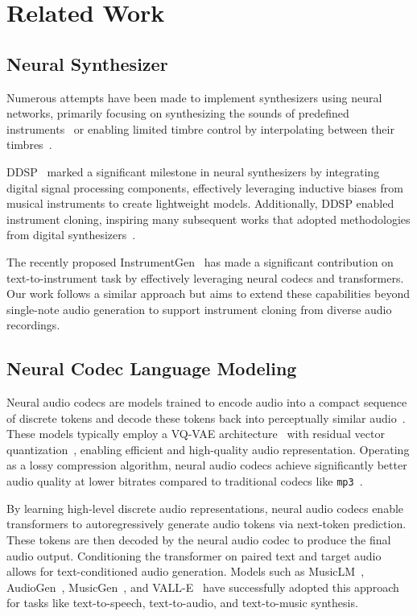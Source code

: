 \section{Related Work}
\label{sec:related_work}

\subsection{Neural Synthesizer}
Numerous attempts have been made to implement synthesizers using neural networks, primarily focusing on synthesizing the sounds of predefined instruments~\cite{sing} or enabling limited timbre control by interpolating between their timbres~\cite{nsynthwavenet,gansynth,flexible}.

DDSP~\cite{ddsp,ddspreview} marked a significant milestone in neural synthesizers by integrating digital signal processing components, effectively leveraging inductive biases from musical instruments to create lightweight models. Additionally, DDSP enabled instrument cloning, inspiring many subsequent works that adopted methodologies from digital synthesizers~\cite{diffwaveshaping,diffwavetable,ddx7}.

The recently proposed InstrumentGen~\cite{instrumentgen, sample-based} has made a significant contribution on text-to-instrument task by effectively leveraging neural codecs and transformers.
Our work follows a similar approach but aims to extend these capabilities beyond single-note audio generation to support instrument cloning from diverse audio recordings. 

\subsection{Neural Codec Language Modeling}

Neural audio codecs are models trained to encode audio into a compact sequence of discrete tokens and decode these tokens back into perceptually similar audio~\cite{soundstream,encodec,dac}. These models typically employ a VQ-VAE architecture~\cite{van2017neural} with residual vector quantization~\cite{rvq1,rvq2}, enabling efficient and high-quality audio representation. Operating as a lossy compression algorithm, neural audio codecs achieve significantly better audio quality at lower bitrates compared to traditional codecs like \texttt{mp3}~\cite{mp3}.

By learning high-level discrete audio representations, neural audio codecs enable transformers to autoregressively generate audio tokens via next-token prediction. These tokens are then decoded by the neural audio codec to produce the final audio output. Conditioning the transformer on paired text and target audio allows for text-conditioned audio generation. Models such as MusicLM~\cite{musiclm}, AudioGen~\cite{audiogen}, MusicGen~\cite{musicgen}, and VALL-E~\cite{vall-e} have successfully adopted this approach for tasks like text-to-speech, text-to-audio, and text-to-music synthesis.